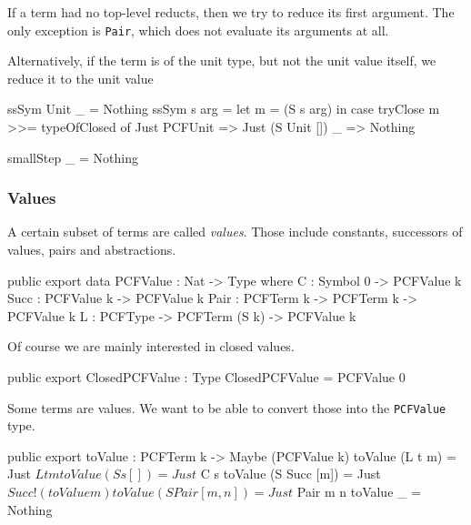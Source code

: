 If a term had no top-level reducts, then we try to reduce its first argument.
The only exception is \lstinline{Pair}, which does not evaluate its arguments at all.


Alternatively, if the term is of the unit type, but not the unit value itself, we reduce it to the
unit value

\begin{code}
  ssSym Unit _ = Nothing
  ssSym s arg  = let m = (S s arg) in
                 case tryClose m >>= typeOfClosed of
                   Just PCFUnit => Just (S Unit [])
                   _            => Nothing

smallStep _ = Nothing
\end{code}

\subsubsection{Values}

A certain subset of terms are called \emph{values}. Those include constants,
successors of values, pairs and abstractions.

\begin{code}
public export
data PCFValue : Nat -> Type where
  C     : Symbol 0   -> PCFValue k
  Succ  : PCFValue k -> PCFValue k
  Pair  : PCFTerm k  -> PCFTerm k     -> PCFValue k
  L     : PCFType    -> PCFTerm (S k) -> PCFValue k
\end{code}

Of course we are mainly interested in closed values.

\begin{code}
public export
ClosedPCFValue : Type
ClosedPCFValue = PCFValue 0
\end{code}

Some terms are values. We want to be able to convert those into the \lstinline{PCFValue} type.

\begin{code}
public export
toValue : PCFTerm k -> Maybe (PCFValue k)
toValue (L t m)         = Just $ L t m
toValue (S s [])        = Just $ C s
toValue (S Succ [m])    = Just $ Succ !(toValue m)
toValue (S Pair [m, n]) = Just $ Pair m n
toValue _               = Nothing
\end{code}


